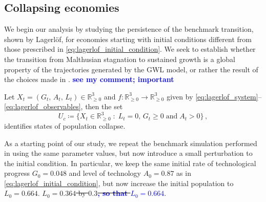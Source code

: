 \documentclass[a4paper,fleqn]{cas-sc}
\newcommand{\samb}[1]{\textcolor{blue}{\textbf{#1}}}
\begin{document}
\subsection{Collapsing economies}\label{subsec:collapse}
We begin our analysis by studying the persistence of the benchmark transition, shown by Lagerl\"{o}f, for economies starting with initial conditions different from those prescribed in \eqref{eq:lagerlof_initial_condition}.
We seek to establish whether the transition from Malthusian stagnation to sustained growth is a global property of the trajectories generated by the GWL model, or rather the result of the choices made in \cite{Lagerlof2006}.
%
\samb{see my comment; important}
\begin{definition}\label{def:population_collapse}
    Let $X_t=(G_t,\,A_t,\,L_t)\in \mathbb{R}^3_{\geq0}$ and $f:\mathbb{R}^3_{\geq0}\to \mathbb{R}^3_{\geq0}$ given by \eqref{eq:lagerlof_system}--\eqref{eq:lagerlof_observables}, then the set
    \begin{equation}\label{eq:population_collapse}
        U_c\coloneqq\{X_t\in \mathbb{R}^3_{\geq0} \;:\;L_t = 0,\,G_t\geq0\;\text{and}\;A_t > 0\}\,,
    \end{equation}
    identifies states of population collapse.
\end{definition}

As a starting point of our study, we repeat the benchmark simulation performed in \cite{Lagerlof2006} using the same parameter values, but now introduce a small perturbation to the initial condition.
In particular, we keep the same initial rate of technological progress $G_0=0.048$ and level of technology $A_0=0.87$ as in \eqref{eq:lagerlof_initial_condition}, but now increase the initial population to $L_0=0.664$. \sout{$L_0=0.364$ by $0.3$\samb{, so that $L_0=0.664$}}.
\end{document}
